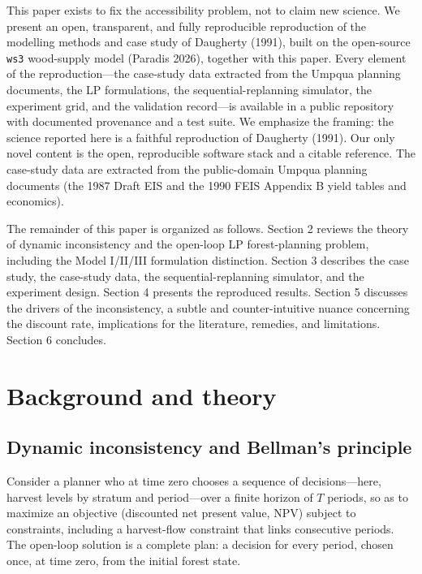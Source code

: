 \documentclass[12pt]{article}
\begin{document}
This paper exists to fix the accessibility problem, not to claim new science. We present an open, transparent, and fully reproducible reproduction of the modelling methods and case study of Daugherty (1991), built on the open-source \texttt{ws3} wood-supply model (Paradis 2026), together with this paper. Every element of the reproduction---the case-study data extracted from the Umpqua planning documents, the LP formulations, the sequential-replanning simulator, the experiment grid, and the validation record---is available in a public repository with documented provenance and a test suite. We emphasize the framing: the science reported here is a faithful reproduction of Daugherty (1991). Our only novel content is the open, reproducible software stack and a citable reference. The case-study data are extracted from the public-domain Umpqua planning documents (the 1987 Draft EIS and the 1990 FEIS Appendix B yield tables and economics).

The remainder of this paper is organized as follows. Section 2 reviews the theory of dynamic inconsistency and the open-loop LP forest-planning problem, including the Model I/II/III formulation distinction. Section 3 describes the case study, the case-study data, the sequential-replanning simulator, and the experiment design. Section 4 presents the reproduced results. Section 5 discusses the drivers of the inconsistency, a subtle and counter-intuitive nuance concerning the discount rate, implications for the literature, remedies, and limitations. Section 6 concludes.

\hypertarget{background-and-theory}{%
\section{Background and theory}\label{background-and-theory}}

\hypertarget{dynamic-inconsistency-and-bellmans-principle}{%
\subsection{Dynamic inconsistency and Bellman's principle}\label{dynamic-inconsistency-and-bellmans-principle}}

Consider a planner who at time zero chooses a sequence of decisions---here, harvest levels by stratum and period---over a finite horizon of \(T\) periods, so as to maximize an objective (discounted net present value, NPV) subject to constraints, including a harvest-flow constraint that links consecutive periods. The open-loop solution is a complete plan: a decision for every period, chosen once, at time zero, from the initial forest state.
\end{document}
